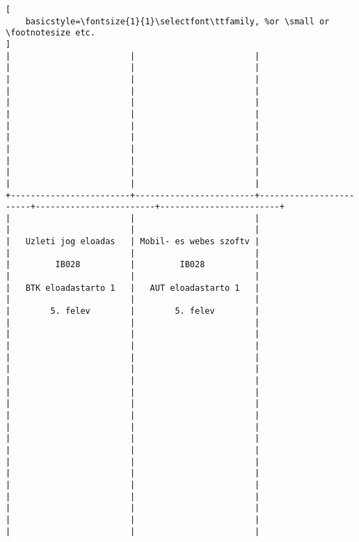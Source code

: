 \begin{lstlisting}[
    basicstyle=\fontsize{1}{1}\selectfont\ttfamily, %or \small or \footnotesize etc.
]
|                        |                        |                        |                        |                        | 
|                        |                        |                        |                        |                        | 
|                        |                        |                        |                        |                        | 
|                        |                        |                        |                        |                        | 
|                        |                        |                        |                        |                        | 
|                        |                        |                        |                        |                        | 
+------------------------+------------------------+------------------------+------------------------+------------------------+
|                        |                        |                        |                        |                        | 
|   Uzleti jog eloadas   | Mobil- es webes szoftv |                        |                        |                        | 
|         IB028          |         IB028          |                        |                        |                        | 
|   BTK eloadastarto 1   |   AUT eloadastarto 1   |                        |                        |                        | 
|        5. felev        |        5. felev        |                        |                        |                        | 
|                        |                        |                        |                        |                        | 
|                        |                        |                        |                        |                        | 
|                        |                        |                        |                        |                        | 
|                        |                        |                        |                        |                        | 
|                        |                        |                        |                        |                        | 
|                        |                        |                        |                        |                        | 
|                        |                        |                        |                        |                        | 
|                        |                        |                        |                        |                        | 
|                        |                        |                        |                        |                        | 

\end{lstlisting}

